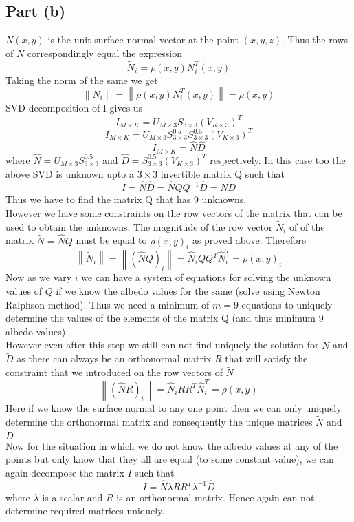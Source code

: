 \documentclass{article}
\newcommand\norm[1]{\left\lVert#1\right\rVert}
\begin{document}
\subsection*{Part (b)}
$N(x,y)$ is the unit surface normal vector at the point $(x,y,z)$.
Thus the rows of $\tilde{N}$ correspondingly equal the expression
$$ \tilde{N}_i = \rho(x,y)N^T_i(x,y) $$
Taking the norm of the same we get
$$ \norm{N_i} = \norm{\rho(x,y)N^T_i(x,y)} = \rho(x,y) $$
SVD decomposition of I gives us
$$ I_{M \times K} = U_{M \times 3} S_{3 \times 3} (V_{K \times 3})^T $$
$$ I_{M \times K} = U_{M \times 3} S^0.5_{3 \times 3} S^0.5_{3 \times 3} (V_{K \times 3})^T $$
$$ I_{M \times K} = \hat{N} \hat{D} $$
where $\hat{N} = U_{M \times 3} S^0.5_{3 \times 3}$ and $\hat{D} = S^0.5_{3 \times 3} (V_{K \times 3})^T$ respectively. In this case too the above SVD is unknown upto a $3 \times 3$ invertible matrix Q such that
$$ I = \hat{N}\hat{D} = \hat{N} Q Q^{-1} \hat{D} = \tilde{N}\tilde{D} $$
Thus we have to find the matrix Q that has 9 unknowns. \\
However we have some constraints on the row vectors of the matrix that can be used to obtain the unknowns. The magnitude of the row vector $\tilde{N}_i$ of of the matrix $\tilde{N} = \hat{N}Q$ must be equal to $\rho(x,y)_i$ as proved above. Therefore 
$$ \norm{\tilde{N}_i} = \norm{(\hat{N}Q)_i} = \hat{N}_iQQ^T\hat{N}^T_i = \rho(x,y)_i $$
Now as we vary $i$ we can have a system of equations for solving the unknown values of $Q$ if we know the albedo values for the same (solve using Newton Ralphson method). Thus we need a minimum of $m = 9$ equations to uniquely determine the values of the elements of the matrix Q (and thus minimum 9 albedo values).\\
However even after this step we still can not find uniquely the solution for $\tilde{N}$ and $\tilde{D}$ as there can always be an orthonormal matrix $R$ that will satisfy the constraint that we introduced on the row vectors of $\tilde{N}$
$$ \norm{(\hat{N}R)_i} = \hat{N}_i R R^T \hat{N}^T_i = \rho(x,y) $$
Here if we know the surface normal to any one point then we can only uniquely determine the orthonormal matrix and consequently the unique matrices $\tilde{N}$ and $\tilde{D}$\\
Now for the situation in which we do not know the albedo values at any of the points but only know that they all are equal (to some constant value), we can again decompose the matrix $I$ such that 
$$ I = \hat{N} \lambda R R^T \lambda^{-1} \hat{D} $$
where $\lambda$ is a scalar and $R$ is an orthonormal matrix. Hence again can not determine required matrices uniquely.
\end{document}
